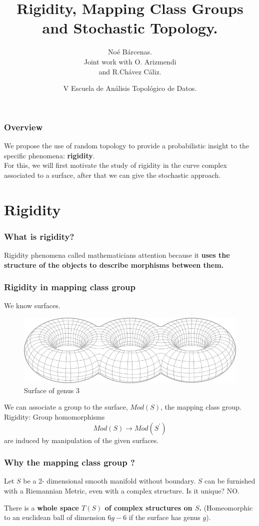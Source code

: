 \documentclass[handout]{beamer}
\title{Rigidity, Mapping  Class Groups  and Stochastic Topology. }
\author{No\'e B\'arcenas.\\ Joint work with O. Arizmendi \\  and R.Ch\'avez C\'aliz.}
\institute{Centro de  Ciencias Matem\'aticas. \\ UNAM. }
\date{V Escuela  de  An\'alisis Topol\'ogico  de  Datos.}
\theoremstyle{plain}
\begin{document}
\begin{frame}
\titlepage
\end{frame}

\begin{frame}
\frametitle{Overview}
We propose the use of random topology to provide a probabilistic insight to the specific phenomena: \textbf{rigidity}.\\
For this, we will first motivate the study of rigidity in the curve complex associated to a surface, after that we can give the stochastic approach.
\end{frame}

\section{Rigidity}

\begin{frame}
\frametitle{What  is  rigidity?}

Rigidity phenomena called mathematicians attention because it \textbf{uses the structure of the objects to describe morphisms between them.}

\end{frame}

\begin{frame}
\frametitle{Rigidity in mapping class group}

We know surfaces. \\
\begin{figure}[h!]
	\centering
	\includegraphics[scale=0.35]{CHARLA_STOCHASTIC_TOPOLOGY_MCG_CIMATNOVEMBER_2018/multitorus.png}
	\caption{Surface of genus 3}
\end{figure}

We  can  associate a  group  to the surface, $Mod(S)$,  the  mapping  class  group. \pause
Rigidity: Group  homomorphisms 
$$ Mod(S) \to Mod  (S^{'})$$
are  induced  by  manipulation  of  the  given surfaces. 
\end{frame}


\begin{frame}\frametitle{Why the mapping class group ?}

Let  $S$  be  a 2- dimensional  smooth  manifold without  boundary. \pause
$S$  can  be  furnished  with  a Riemannian  Metric, even with  a  complex structure. \pause Is  it  unique? \pause
NO. \pause 

There  is  a  \textbf{whole  space $T(S)$ of  complex  structures  on  $S$.} \pause (Homeomorphic  to  an  euclidean ball  of  dimension $6g-6$  if  the  surface  has  genus  $g$). \pause 

\end{frame}
\end{document}
